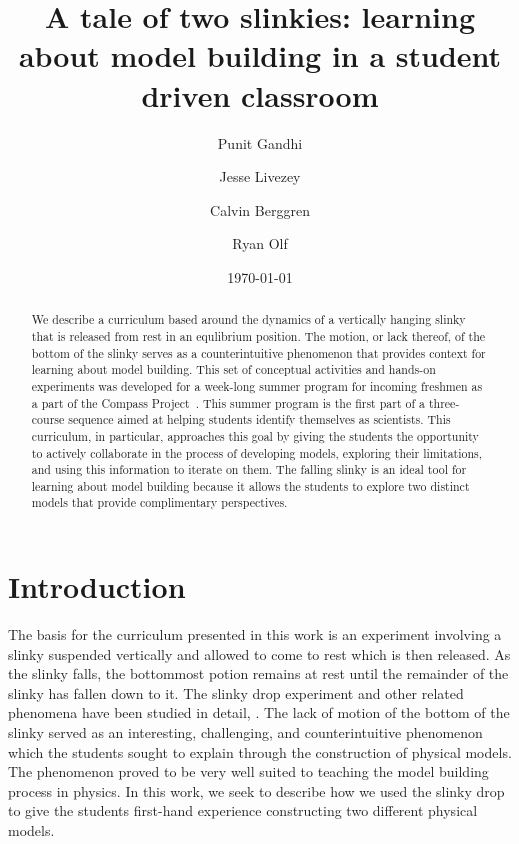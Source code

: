 \documentclass[aps,pre,10pt,superscriptaddress,showpacs,amsmath,amssymb,nofootinbib]{revtex4-1}
\begin{document}
\title{A tale of two slinkies: learning about model building in a student driven classroom }
\author{Punit  Gandhi}
\author{Jesse Livezey}
\author{Calvin Berggren}
\author{Ryan Olf}
\date{\today}

\begin{abstract}
We describe a curriculum based around the dynamics of a vertically hanging slinky that is released from rest in an equlibrium position.
The motion, or lack thereof, of the bottom of the slinky serves as a counterintuitive phenomenon that provides context for learning about model building.
This set of conceptual activities and hands-on experiments was developed for a week-long summer program for incoming freshmen as a part of the Compass Project~\cite{albana2013}.  
This summer program is the first part of a three-course sequence aimed at helping students identify themselves as scientists.  
This curriculum, in particular, approaches this goal by giving the students the opportunity to actively collaborate in the process of developing models, exploring their limitations, and using this information to iterate on them.  
The falling slinky is an ideal tool for learning about model building because it allows the students to explore two distinct models that provide complimentary perspectives.
\end{abstract}

\maketitle

\section{Introduction}


The basis for the curriculum presented in this work is an experiment involving a slinky
suspended vertically and allowed to come to rest which is then released. As the
slinky falls, the bottommost potion remains at rest until the remainder of the
slinky has fallen down to it.
The slinky drop experiment and other related phenomena have
been studied in detail, \cite{calkin1993, newburgh1995, graham2001, aguirregabiria2007,unruh2011, cross2012}.
The lack of motion of the bottom of the slinky
served as an interesting, challenging, and counterintuitive phenomenon which the students sought to explain through
the construction of physical models. The phenomenon proved to be very well suited to
teaching the model building process in physics. In this work,
we seek to describe how we used the slinky drop to give the students first-hand
experience constructing two different physical models.
\end{document}
